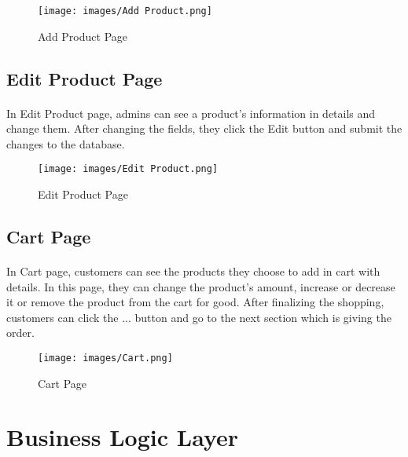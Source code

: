 \documentclass[12pt]{article}
\begin{document}
\bigskip
\bigskip
\bigskip
\begin{figure}[h]
\centerline{\texttt{[image: images/Add Product.png]}}
\caption{Add Product Page}
\label{fig}
\end{figure}

\newpage
\subsection{Edit Product Page}
\bigskip
\paragraph{}
In Edit Product page, admins can see a product's information in details and change them. After changing the fields, they click the Edit button and submit the changes to the database. 
\bigskip
\bigskip
\bigskip
\begin{figure}[h]
\centerline{\texttt{[image: images/Edit Product.png]}}
\caption{Edit Product Page}
\label{fig}
\end{figure}

\newpage
\subsection{Cart Page}
\bigskip
\paragraph{}
In Cart page, customers can see the products they choose to add in cart with details. In this page, they can change the product's amount, increase or decrease it or remove the product from the cart for good. After finalizing the shopping, customers can click the ... button and go to the next section which is giving the order.
\bigskip
\bigskip
\bigskip
\begin{figure}[h]
\centerline{\texttt{[image: images/Cart.png]}}
\caption{Cart Page}
\label{fig}
\end{figure}


\newpage
\section{Business Logic Layer}
\bigskip
\paragraph{} 
\end{document}
